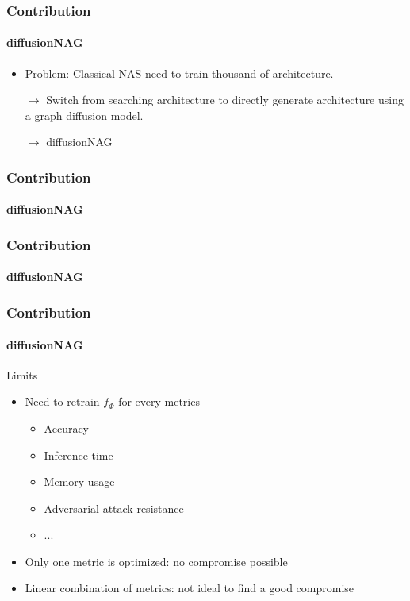 \documentclass[aspectratio=169,xcolor=dvipsnames]{beamer}
\begin{document}
\begin{frame}
    \frametitle{Contribution}
    \framesubtitle{diffusionNAG}
    \begin{itemize}
        \item Problem: Classical NAS need to train thousand of architecture.
        \item [$\rightarrow$] Switch from searching architecture to directly generate architecture using a graph diffusion model.
        \item [$\rightarrow$] diffusionNAG
    \end{itemize}
\end{frame}

\begin{frame}
    \frametitle{Contribution}
    \framesubtitle{diffusionNAG}
    \begin{figure}[htbp]
        \centering
    \end{figure}
\end{frame}

\begin{frame}
    \frametitle{Contribution}
    \framesubtitle{diffusionNAG}
    \begin{figure}[htbp]
        \centering
    \end{figure}
\end{frame}
\begin{frame}
    \frametitle{Contribution}
    \framesubtitle{diffusionNAG}
    Limits
    \begin{itemize}
        \item Need to retrain $ f_\Phi $ for every metrics
        \begin{itemize}
            \item Accuracy
            \item Inference time
            \item Memory usage
            \item Adversarial attack resistance
            \item ...
        \end{itemize}
        \item Only one metric is optimized: no compromise possible
        \item Linear combination of metrics: not ideal to find a good compromise
    \end{itemize}
\end{frame}
\end{document}
